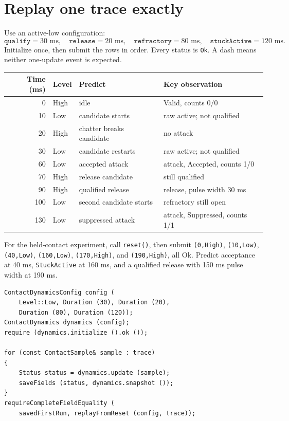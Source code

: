 \documentclass[11pt]{article}
\begin{document}
\section{Replay one trace exactly}
Use an active-low configuration:
\[
\texttt{qualify}=30\text{ ms},\quad
\texttt{release}=20\text{ ms},\quad
\texttt{refractory}=80\text{ ms},\quad
\texttt{stuckActive}=120\text{ ms}.
\]
Initialize once, then submit the rows in order. Every status is
\texttt{Ok}. A dash means neither one-update event is expected.

\begin{tabularx}{\linewidth}{@{}r l X X@{}}
\toprule
Time (ms) & Level & Predict & Key observation\\
\midrule
0   & High & idle & Valid, counts 0/0\\
10  & Low  & candidate starts & raw active; not qualified\\
20  & High & chatter breaks candidate & no attack\\
30  & Low  & candidate restarts & raw active; not qualified\\
60  & Low  & accepted attack & attack, Accepted, counts 1/0\\
70  & High & release candidate & still qualified\\
90  & High & qualified release & release, pulse width 30 ms\\
100 & Low  & second candidate starts & refractory still open\\
130 & Low  & suppressed attack & attack, Suppressed, counts 1/1\\
\bottomrule
\end{tabularx}

For the held-contact experiment, call \texttt{reset()}, then submit
\texttt{(0,High)}, \texttt{(10,Low)}, \texttt{(40,Low)},
\texttt{(160,Low)}, \texttt{(170,High)}, and \texttt{(190,High)}, all Ok.
Predict acceptance at 40 ms, \texttt{StuckActive} at 160 ms, and a qualified
release with 150 ms pulse width at 190 ms.

\begin{lstlisting}[style=adkcpp]
ContactDynamicsConfig config (
    Level::Low, Duration (30), Duration (20),
    Duration (80), Duration (120));
ContactDynamics dynamics (config);
require (dynamics.initialize ().ok ());

for (const ContactSample& sample : trace)
{
    Status status = dynamics.update (sample);
    saveFields (status, dynamics.snapshot ());
}
requireCompleteFieldEquality (
    savedFirstRun, replayFromReset (config, trace));
\end{lstlisting}
\end{document}
